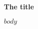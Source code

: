 \documentclass[openany]{memoir}
\newcommand*\spocktitle{
    \centering
    {\Huge\bfseries The title}
    \vfill}
\begin{document}
    \frontmatter
    \begin{titlingpage}
    \spocktitle
    \end{titlingpage}
    \tableofcontents*
    \clearpage
    $body$
\end{document}
